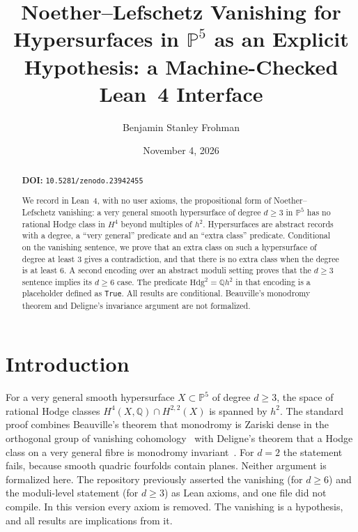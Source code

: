 \documentclass[11pt]{amsart}
\title[NoetherLefschetz]{Noether--Lefschetz Vanishing for Hypersurfaces in $\mathbb P^5$ as an Explicit Hypothesis: a Machine-Checked Lean~4 Interface}
\author{Benjamin Stanley Frohman}
\date{November 4, 2026}
\theoremstyle{definition}
\theoremstyle{remark}
\begin{document}
\begin{abstract}
\noindent\textbf{DOI:} \texttt{10.5281/zenodo.23942455}\par\smallskip

We record in Lean~4, with no user axioms, the propositional form of Noether--Lefschetz vanishing: a very general smooth hypersurface of degree $d\ge3$ in $\mathbb P^5$ has no rational Hodge class in $H^4$ beyond multiples of $h^2$. Hypersurfaces are abstract records with a degree, a ``very general'' predicate and an ``extra class'' predicate. Conditional on the vanishing sentence, we prove that an extra class on such a hypersurface of degree at least $3$ gives a contradiction, and that there is no extra class when the degree is at least $6$. A second encoding over an abstract moduli setting proves that the $d\ge3$ sentence implies its $d\ge6$ case. The predicate $\mathrm{Hdg}^2=\mathbb Q h^2$ in that encoding is a placeholder defined as \texttt{True}. All results are conditional. Beauville's monodromy theorem and Deligne's invariance argument are not formalized.
\end{abstract}
\maketitle
{}\par


\section{Introduction}
For a very general smooth hypersurface $X\subset\mathbb P^5$ of degree $d\ge3$, the space of rational Hodge classes $H^4(X,\mathbb Q)\cap H^{2,2}(X)$ is spanned by $h^2$. The standard proof combines Beauville's theorem that monodromy is Zariski dense in the orthogonal group of vanishing cohomology~\cite{beauville} with Deligne's theorem that a Hodge class on a very general fibre is monodromy invariant~\cite{deligne}. For $d=2$ the statement fails, because smooth quadric fourfolds contain planes. Neither argument is formalized here. The repository previously asserted the vanishing (for $d\ge6$) and the moduli-level statement (for $d\ge3$) as Lean axioms, and one file did not compile. In this version every axiom is removed. The vanishing is a hypothesis, and all results are implications from it.
\end{document}
